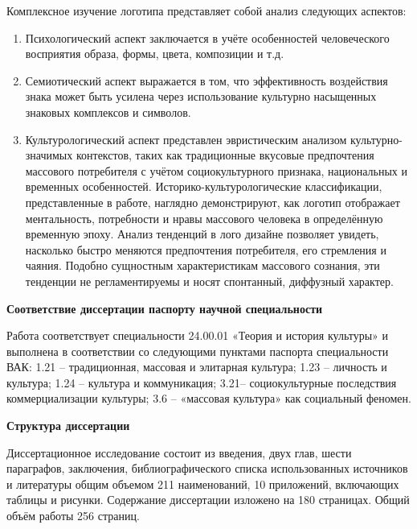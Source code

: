 Комплексное изучение логотипа представляет собой анализ следующих аспектов:
\begin{enumerate}
\item Психологический аспект заключается в учёте особенностей человеческого восприятия образа, формы, цвета, композиции и т.д.
\item Семиотический аспект выражается в том, что эффективность воздействия знака может быть усилена через использование культурно насыщенных знаковых комплексов и символов.
\item Культурологический аспект представлен эвристическим анализом культурно\hyp{}значимых контекстов, таких как традиционные вкусовые предпочтения массового потребителя с учётом социокультурного признака, национальных и временных особенностей. Историко-культурологические классификации, представленные в работе, наглядно демонстрируют, как логотип отображает ментальность, потребности и нравы массового человека в определённую временную эпоху. Анализ тенденций в лого дизайне позволяет увидеть, насколько быстро меняются предпочтения потребителя, его стремления и чаяния. Подобно сущностным характеристикам массового сознания, эти тенденции не регламентируемы и носят спонтанный, диффузный характер.
\end{enumerate}

\textbf{Соответствие диссертации паспорту научной специальности}

Работа соответствует специальности 24.00.01 «Теория и история культуры» и выполнена в соответствии со следующими пунктами паспорта специальности ВАК: 1.21 – традиционная, массовая и элитарная культура; 1.23 – личность и культура; 1.24 – культура и коммуникация; 3.21– социокультурные последствия коммерциализации культуры; 3.6 – «массовая культура» как социальный феномен.

\textbf{Структура диссертации}

Диссертационное исследование состоит из введения, двух глав, шести параграфов, заключения, библиографического списка использованных источников и литературы общим объемом 211 наименований, 10 приложений, включающих таблицы и рисунки. Содержание диссертации изложено на 180 страницах. Общий объём работы 256 страниц.
